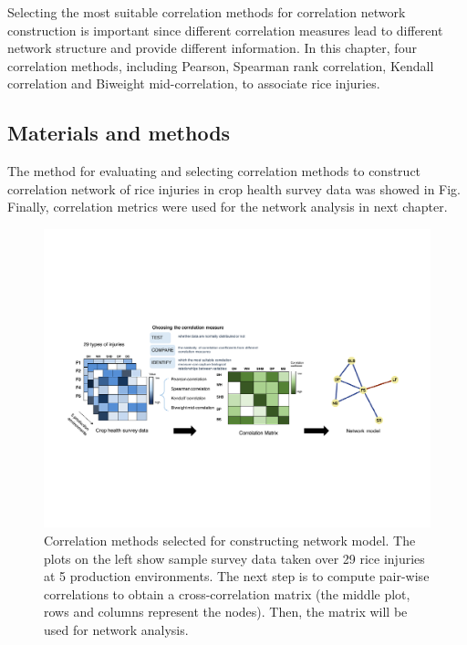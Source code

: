 Selecting the most suitable correlation methods for correlation network construction is important since different correlation measures lead to different network structure and provide different information. In this chapter, four correlation methods, including Pearson, Spearman rank correlation, Kendall correlation \citep{Prokhorov_2001_Kendall} and Biweight mid-correlation, to associate rice injuries. 
 

\subsection{Materials and methods}

The method for evaluating and selecting correlation methods to construct correlation network of rice injuries in crop health survey data was showed in Fig. Finally, correlation metrics were used for the network analysis in next chapter.

\begin{figure}
    \centering
     \includegraphics[width = 1\textwidth]{figures/pipeline4/pipeline4.pdf}
    \caption{Correlation methods selected for constructing network model. The plots on the left show sample survey data taken over 29 rice injuries at 5 production environments. The next step is to compute pair-wise correlations to obtain a cross-correlation matrix (the middle plot, rows and columns represent the nodes). Then, the matrix will be used for network analysis.}
    \label{fig:pipeline1}
\end{figure}

